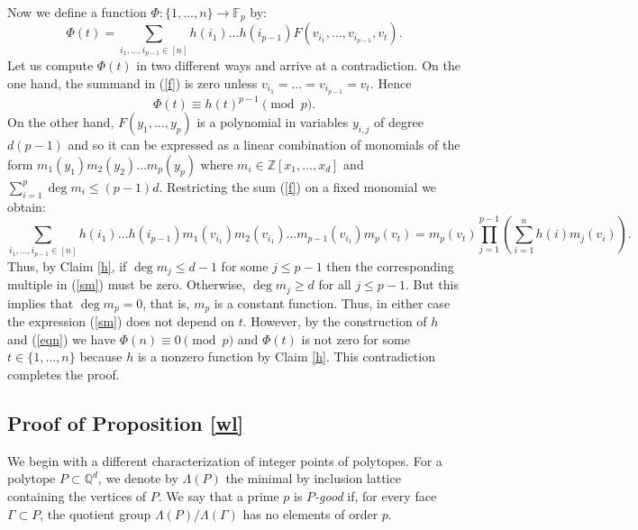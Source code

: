 \documentclass{daj}
\renewcommand{\le}{\leqslant}
\renewcommand{\ge}{\geqslant}
\newcommand{\Q}{\mathbb Q}
\newcommand{\Z}{\mathbb Z}
\newcommand{\FF}{\mathbb F}
\theoremstyle{definition}
\theoremstyle{remark}
\theoremstyle{definition}
\theoremstyle{definition}
\begin{document}
Now we define a function $\Phi: \{1, \ldots, n\} \rightarrow \FF_p$ by:
\begin{equation}\label{f}
    \Phi(t) = \sum_{i_1, \ldots, i_{p-1} \in [n]} h(i_1)\ldots h(i_{p-1}) F(v_{i_1}, \ldots, v_{i_{p-1}}, v_t).
\end{equation}
Let us compute $\Phi(t)$ in two different ways and arrive at a contradiction. On the one hand, the summand in (\ref{f}) is zero unless $v_{i_1} = \ldots = v_{i_{p-1}} = v_t$. Hence 
\begin{equation}\label{eqn}
    \Phi(t) \equiv h(t)^{p-1} \pmod p.
\end{equation}
On the other hand, $F(y_1, \ldots, y_p)$ is a polynomial in variables $y_{i, j}$ of degree $d(p-1)$ and so it can be expressed as a linear combination of monomials of the form $m_1(y_1) m_2(y_2) \ldots m_{p}(y_p)$ where $m_i \in \Z[x_1, \ldots, x_d]$ and $\sum_{i=1}^p \deg m_i \le (p-1)d$. Restricting the sum (\ref{f}) on a fixed monomial we obtain:
\begin{equation}\label{sm}
    \sum_{i_1, \ldots, i_{p-1} \in [n]} h(i_1)\ldots h(i_{p-1}) m_1(v_{i_1}) m_2(v_{i_1}) \ldots m_{p-1}(v_{i_1}) m_{p}(v_t) = m_{p}(v_t) \prod_{j = 1}^{p-1} \left ( \sum_{i = 1}^n h(i)m_j(v_{i}) \right).
\end{equation}
Thus, by Claim \ref{h}, if $\deg m_j \le d-1$ for some $j \le p-1$ then the corresponding multiple in (\ref{sm}) must be zero. Otherwise, $\deg m_j \ge d$ for all $j \le p-1$. But this implies that $\deg m_p = 0$, that is, $m_p$ is a constant function. Thus, in either case the expression (\ref{sm}) does not depend on $t$. However, by the construction of $h$ and (\ref{eqn}) we have $\Phi(n) \equiv 0 \pmod p$ and $\Phi(t)$ is not zero for some $t \in \{1, \ldots, n\}$ because $h$ is a nonzero function by Claim \ref{h}. This contradiction completes the proof.

\subsection{Proof of Proposition \ref{wl}}\label{theasy1}

We begin with a different characterization of integer points of polytopes. For a polytope $P \subset \Q^d$, we denote by $\Lambda(P)$ the minimal by inclusion lattice containing the vertices of $P$. We say that a prime $p$ is {\it $P$-good} if, for every face $\Gamma \subset P$, the quotient group $\Lambda(P) / \Lambda(\Gamma)$ has no elements of order $p$.
\end{document}
